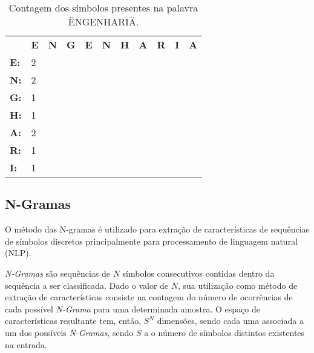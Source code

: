\documentclass[
	12pt,				%
	openright,			%
	twoside,			%
	a4paper,			%
	english,			%
	spanish,			%
	brazil,				%
	]{abntex2}\usepackage[]{graphicx}\usepackage[]{color}
\begin{document}
\begin{table}[]
\centering
\begin{tabular}{lllllllllll}
            & \textbf{E} & \textbf{N} & \textbf{G} & \textbf{E} & \textbf{N} & \textbf{H} & \textbf{A} & \textbf{R} & \textbf{I} & \textbf{A} \\
\textbf{E:} & 2          &            &            &            &            &            &            &            &            &            \\
\textbf{N:} & 2          &            &            &            &            &            &            &            &            &            \\
\textbf{G:} & 1          &            &            &            &            &            &            &            &            &            \\
\textbf{H:} & 1          &            &            &            &            &            &            &            &            &            \\
\textbf{A:} & 2          &            &            &            &            &            &            &            &            &            \\
\textbf{R:} & 1          &            &            &            &            &            &            &            &            &            \\
\textbf{I:} & 1          &            &            &            &            &            &            &            &            &           
\end{tabular}
\caption{Contagem dos símbolos presentes na palavra \mbox{\"ENGENHARIA\"}. }
\end{table}

\subsection{N-Gramas}
\label{subngramas}

O método das N-gramas \cite{Xing2010} é utilizado para extração de características de sequências de símbolos discretos principalmente para processamento de linguagem natural (NLP).

\textit{N-Gramas} são sequências de $N$ símbolos consecutivos contidas dentro da sequência a ser classificada. Dado o valor de $N$, sua utilização como método de extração de características consiste na contagem do número de ocorrências de cada possível \textit{N-Grama} para uma determinada amostra. O espaço de características resultante tem, então, $S^N$ dimensões, sendo cada uma associada a um dos possíveis \textit{N-Gramas}, sendo $S$ a o número de símbolos distintos existentes na entrada.
\end{document}
